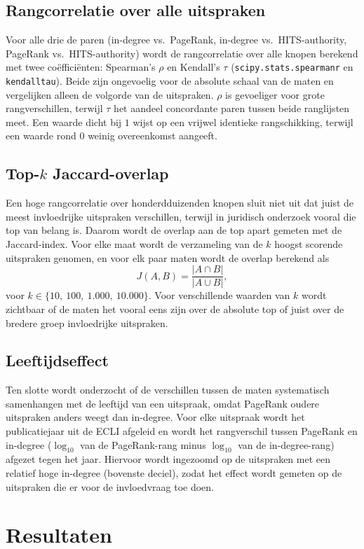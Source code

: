 \documentclass[a4paper, 12pt]{report}
\begin{document}
\subsection{Rangcorrelatie over alle uitspraken} Voor alle drie de paren (in-degree vs.\ PageRank, in-degree vs.\ HITS-authority, PageRank vs.\ HITS-authority) wordt de rangcorrelatie over alle knopen berekend met twee coëfficiënten: Spearman's $\rho$ en Kendall's $\tau$ (\texttt{scipy.stats.spearmanr} en \texttt{kendalltau}). Beide zijn ongevoelig voor de absolute schaal van de maten en vergelijken alleen de volgorde van de uitspraken. $\rho$ is gevoeliger voor grote rangverschillen, terwijl $\tau$ het aandeel concordante paren tussen beide ranglijsten meet. Een waarde dicht bij $1$ wijst op een vrijwel identieke rangschikking, terwijl een waarde rond $0$ weinig overeenkomst aangeeft.

\subsection{Top-$k$ Jaccard-overlap} Een hoge rangcorrelatie over honderdduizenden knopen sluit niet uit dat juist de meest invloedrijke uitspraken verschillen, terwijl in juridisch onderzoek vooral die top van belang is. Daarom wordt de overlap aan de top apart gemeten met de Jaccard-index. Voor elke maat wordt de verzameling van de $k$ hoogst scorende uitspraken genomen, en voor elk paar maten wordt de overlap berekend als
\[
  J(A, B) = \frac{|A \cap B|}{|A \cup B|},
\]
voor $k \in \{10,\ 100,\ 1{.}000,\ 10{.}000\}$. Voor verschillende waarden van $k$ wordt zichtbaar of de maten het vooral eens zijn over de absolute top of juist over de bredere groep invloedrijke uitspraken.

\subsection{Leeftijdseffect} Ten slotte wordt onderzocht of de verschillen tussen de maten systematisch samenhangen met de leeftijd van een uitspraak, omdat PageRank oudere uitspraken anders weegt dan in-degree. Voor elke uitspraak wordt het publicatiejaar uit de ECLI afgeleid en wordt het rangverschil tussen PageRank en in-degree ($\log_{10}$ van de PageRank-rang minus $\log_{10}$ van de in-degree-rang) afgezet tegen het jaar. Hiervoor wordt ingezoomd op de uitspraken met een relatief hoge in-degree (bovenste deciel), zodat het effect wordt gemeten op de uitspraken die er voor de invloedvraag toe doen.


\section{Resultaten}
\end{document}
